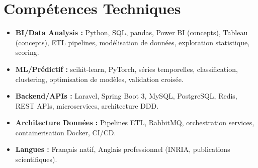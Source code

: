 \documentclass[a4paper,11pt]{article}
\begin{document}
\section{Comp\'etences Techniques}
\begin{itemize}[leftmargin=*, label=\tiny$\bullet$, nosep]
    \item \textbf{BI/Data Analysis :} Python, SQL, pandas, Power BI (concepts), Tableau (concepts), ETL pipelines, mod\'elisation de donn\'ees, exploration statistique, scoring.
    \item \textbf{ML/Pr\'edictif :} scikit-learn, PyTorch, s\'eries temporelles, classification, clustering, optimisation de mod\`eles, validation crois\'ee.
    \item \textbf{Backend/APIs :} Laravel, Spring Boot 3, MySQL, PostgreSQL, Redis, REST APIs, microservices, architecture DDD.
    \item \textbf{Architecture Donn\'ees :} Pipelines ETL, RabbitMQ, orchestration services, containerisation Docker, CI/CD.
    \item \textbf{Langues :} Fran\c{c}ais natif, Anglais professionnel (INRIA, publications scientifiques).
\end{itemize}
\end{document}
